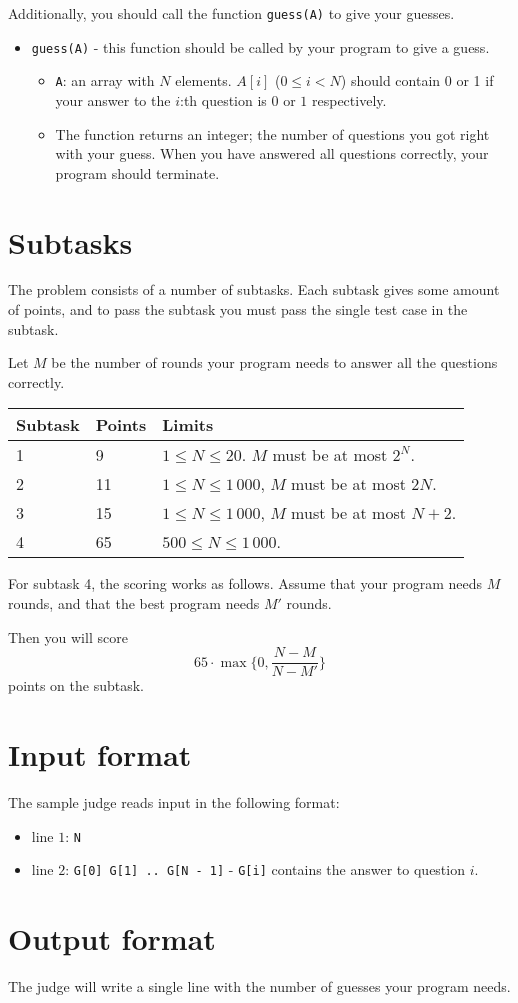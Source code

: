 Additionally, you should call the function \texttt{guess(A)} to give your guesses.
\begin{itemize}
  \item \texttt{guess(A)} - this function should be called by your program to give a guess.
    \begin{itemize}
      \item \texttt{A}: an array with $N$ elements. $A[i]$ ($0 \le i < N$) should contain 0 or 1 if your answer to the $i$:th question is $0$ or $1$ respectively.
      \item The function returns an integer; the number of questions you got right with your guess. When you have answered all questions correctly, your program should terminate.
    \end{itemize}
\end{itemize}


\section*{Subtasks}
The problem consists of a number of subtasks. Each subtask gives some amount of points, and to pass
the subtask you must pass the single test case in the subtask.

Let $M$ be the number of rounds your program needs to answer all the questions correctly.
\begin{tabular}{|l|l|l|}
  \hline
  \textbf{Subtask} & \textbf{Points} & \textbf{Limits} \\ \hline
  1 & 9 & $1 \le N \le 20$. $M$ must be at most $2^N$.  \\ \hline
  2 & 11 & $1 \le N \le 1\,000$, $M$ must be at most $2N$. \\ \hline
  3 & 15 & $1 \le N \le 1\,000$, $M$ must be at most $N + 2$. \\ \hline
  4 & 65 & $500 \le N \le 1\,000$. \\ \hline
\end{tabular}

For subtask 4, the scoring works as follows. Assume that your program needs $M$ rounds,
and that the best program needs $M'$ rounds.

Then you will score
\[ 65 \cdot \max \{ 0, \frac{N - M}{N - M'} \} \]
points on the subtask.

\section*{Input format}
The sample judge reads input in the following format:

\begin{itemize}
  \item line $1$: \texttt{N}
  \item line $2$: \texttt{G[0] G[1] .. G[N - 1]} - \texttt{G[i]} contains the answer to question $i$.
\end{itemize}

\section*{Output format}
The judge will write a single line with the number of guesses your program needs.
